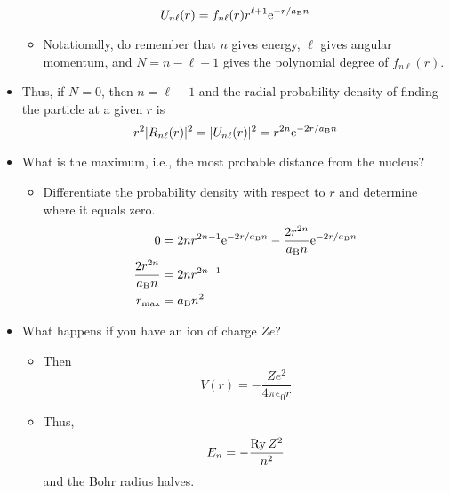 \documentclass[../notes.tex]{subfiles}
\begin{document}
\begin{itemize}
\begin{equation*}
        U_{n\ell}(r) = f_{n\ell}(r)r^{\ell+1}\e[-r/a_\text{B}n]
    \end{equation*}
    \begin{itemize}
        \item Notationally, do remember that $n$ gives energy, $\ell$ gives angular momentum, and $N=n-\ell-1$ gives the polynomial degree of $f_{n\ell}(r)$.
    \end{itemize}
    \item Thus, if $N=0$, then $n=\ell+1$ and the radial probability density of finding the particle at a given $r$ is
    \begin{equation*}
        r^2|R_{n\ell}(r)|^2 = |U_{n\ell}(r)|^2 = r^{2n}\e[-2r/a_\text{B}n]
    \end{equation*}
    \item What is the maximum, i.e., the most probable distance from the nucleus?
    \begin{itemize}
        \item Differentiate the probability density with respect to $r$ and determine where it equals zero.
        \begin{align*}
            0 &= 2nr^{2n-1}\e[-2r/a_\text{B}n]-\frac{2r^{2n}}{a_\text{B}n}\e[-2r/a_\text{B}n]\\
            \frac{2r^{2n}}{a_\text{B}n} &= 2nr^{2n-1}\\
            r_\text{max} &= a_\text{B}n^2
        \end{align*}
    \end{itemize}
    \item What happens if you have an ion of charge $Ze$?
    \begin{itemize}
        \item Then
        \begin{equation*}
            V(r) = -\frac{Ze^2}{4\pi\epsilon_0r}
        \end{equation*}
        \item Thus,
        \begin{equation*}
            E_n = -\frac{\Ry Z^2}{n^2}
        \end{equation*}
        and the Bohr radius halves.
    \end{itemize}
\end{itemize}
\end{document}
